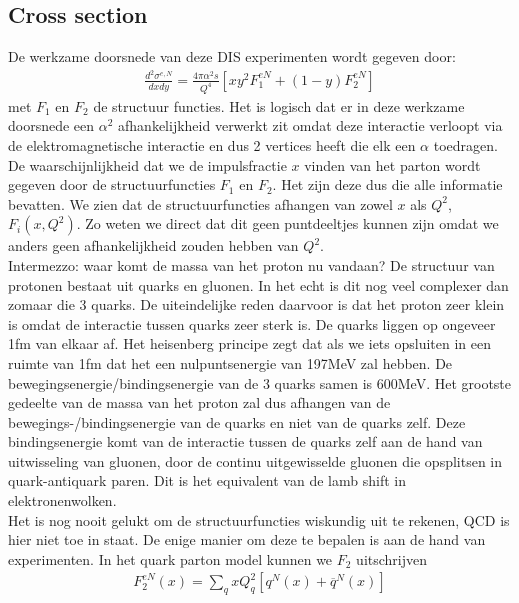 \documentclass[../main.tex]{subfiles}
\begin{document}
\subsection{Cross section}%
\label{sub:cross_section}

De werkzame doorsnede van deze DIS experimenten wordt gegeven door:
\begin{equation}
    \begin{aligned}
        \label{eq:dis_werkzame_doorsnede}
        \frac{d^2\sigma^{e,N}}{dxdy} = \frac{4\pi\alpha^2s}{Q^4} [xy^2F_1^{eN}+(1-y)F_2^{eN}]
    \end{aligned}
\end{equation}
met $F_1$ en $F_2$ de structuur functies. Het is logisch dat er in deze werkzame doorsnede een $\alpha^2$ afhankelijkheid verwerkt zit omdat deze interactie verloopt via de elektromagnetische interactie en dus 2 vertices heeft die elk een $\alpha$ toedragen. De waarschijnlijkheid dat we de impulsfractie $x$ vinden van het parton wordt gegeven door de structuurfuncties $F_1$ en $F_2$. Het zijn deze dus die alle informatie bevatten. We zien dat de structuurfuncties afhangen van zowel $x$ als $Q^2$, $F_i(x, Q^2)$. Zo weten we direct dat dit geen puntdeeltjes kunnen zijn omdat we anders geen afhankelijkheid zouden hebben van $Q^2$.\\
{\color{blue}Intermezzo: waar komt de massa van het proton nu vandaan? De structuur van protonen bestaat uit quarks en gluonen. In het echt is dit nog veel complexer dan zomaar die 3 quarks. De uiteindelijke reden daarvoor is dat het proton zeer klein is omdat de interactie tussen quarks zeer sterk is. De quarks liggen op ongeveer 1fm van elkaar af. Het heisenberg principe zegt dat als we iets opsluiten in een ruimte van 1fm dat het een nulpuntsenergie van 197MeV zal hebben. De bewegingsenergie/bindingsenergie van de 3 quarks samen is 600MeV. Het grootste gedeelte van de massa van het proton zal dus afhangen van de bewegings-/bindingsenergie van de quarks en niet van de quarks zelf. Deze bindingsenergie komt van de interactie tussen de quarks zelf aan de hand van uitwisseling van gluonen, door de continu uitgewisselde gluonen die opsplitsen in quark-antiquark paren. Dit is het equivalent van de lamb shift in elektronenwolken.}\\
Het is nog nooit gelukt om de structuurfuncties wiskundig uit te rekenen, QCD is hier niet toe in staat. De enige manier om deze te bepalen is aan de hand van experimenten. In het quark parton model kunnen we $F_2$ uitschrijven
\begin{equation}
    \begin{aligned}
        \label{eq:tweede_structuur_functie}
        F_2^{eN}(x)=\sum_q xQ_q^2[q^N(x)+\overline q^N (x)]
    \end{aligned}
\end{equation}
\end{document}
